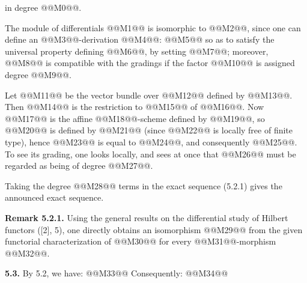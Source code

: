 in degree @@M0@@.

The module of differentials @@M1@@ is isomorphic to @@M2@@, since one can define an @@M3@@-derivation @@M4@@:
@@M5@@
so as to satisfy the universal property defining @@M6@@, by setting @@M7@@; moreover, @@M8@@ is compatible with the gradings if the factor @@M10@@ is assigned degree @@M9@@.

Let @@M11@@ be the vector bundle over @@M12@@ defined by @@M13@@. Then @@M14@@ is the restriction to @@M15@@ of @@M16@@. Now @@M17@@ is the affine @@M18@@-scheme defined by @@M19@@, so @@M20@@ is defined by @@M21@@ (since @@M22@@ is locally free of finite type), hence @@M23@@ is equal to @@M24@@, and consequently @@M25@@. To see its grading, one looks locally, and sees at once that @@M26@@ must be regarded as being of degree @@M27@@.

Taking the degree @@M28@@ terms in the exact sequence (5.2.1) gives the announced exact sequence.

\textbf{Remark 5.2.1.} Using the general results on the differential study of Hilbert functors ([2], 5), one directly obtains an isomorphism @@M29@@ from the given functorial characterization of @@M30@@ for every @@M31@@-morphism @@M32@@.

\textbf{5.3.} By 5.2, we have:
@@M33@@
Consequently:
@@M34@@
